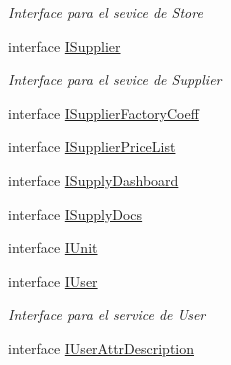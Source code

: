 \begin{DoxyCompactItemize}
\begin{DoxyCompactList}\small\item\em Interface para el sevice de Store \end{DoxyCompactList}\item 
interface \mbox{\hyperlink{interface_h_k_supply_1_1_services_1_1_interfaces_1_1_i_supplier}{I\+Supplier}}
\begin{DoxyCompactList}\small\item\em Interface para el sevice de Supplier \end{DoxyCompactList}\item 
interface \mbox{\hyperlink{interface_h_k_supply_1_1_services_1_1_interfaces_1_1_i_supplier_factory_coeff}{I\+Supplier\+Factory\+Coeff}}
\item 
interface \mbox{\hyperlink{interface_h_k_supply_1_1_services_1_1_interfaces_1_1_i_supplier_price_list}{I\+Supplier\+Price\+List}}
\item 
interface \mbox{\hyperlink{interface_h_k_supply_1_1_services_1_1_interfaces_1_1_i_supply_dashboard}{I\+Supply\+Dashboard}}
\item 
interface \mbox{\hyperlink{interface_h_k_supply_1_1_services_1_1_interfaces_1_1_i_supply_docs}{I\+Supply\+Docs}}
\item 
interface \mbox{\hyperlink{interface_h_k_supply_1_1_services_1_1_interfaces_1_1_i_unit}{I\+Unit}}
\item 
interface \mbox{\hyperlink{interface_h_k_supply_1_1_services_1_1_interfaces_1_1_i_user}{I\+User}}
\begin{DoxyCompactList}\small\item\em Interface para el service de User \end{DoxyCompactList}\item 
interface \mbox{\hyperlink{interface_h_k_supply_1_1_services_1_1_interfaces_1_1_i_user_attr_description}{I\+User\+Attr\+Description}}
\end{DoxyCompactItemize}
